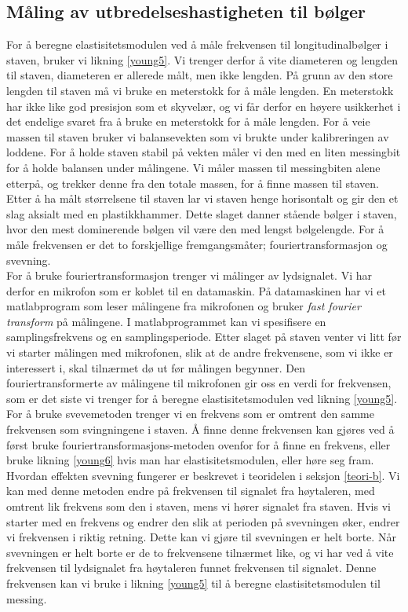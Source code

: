 \documentclass[%
 reprint,
 amsmath,amssymb,
 aps,
 norsk,
 booktabs
]{revtex4-1}
\begin{document}
\subsection{Måling av utbredelseshastigheten til bølger}
For å beregne elastisitetsmodulen ved å måle frekvensen til longitudinalbølger i staven, bruker vi likning \eqref{young5}. Vi trenger derfor å vite diameteren og lengden til staven, diameteren er allerede målt, men ikke lengden. På grunn av den store lengden til staven må vi bruke en meterstokk for å måle lengden. En meterstokk har ikke like god presisjon som et skyvelær, og vi får derfor en høyere usikkerhet i det endelige svaret fra å bruke en meterstokk for å måle lengden. For å veie massen til staven bruker vi balansevekten som vi brukte under kalibreringen av loddene. For å holde staven stabil på vekten måler vi den med en liten messingbit for å holde balansen under målingene. Vi måler massen til messingbiten alene etterpå, og trekker denne fra den totale massen, for å finne massen til staven. Etter å ha målt størrelsene til staven lar vi staven henge horisontalt og gir den et slag aksialt med en plastikkhammer. Dette slaget danner stående bølger i staven, hvor den mest dominerende bølgen vil være den med lengst bølgelengde. For å måle frekvensen er det to forskjellige fremgangsmåter; fouriertransformasjon og svevning.\\ For å bruke fouriertransformasjon trenger vi målinger av lydsignalet. Vi har derfor en mikrofon som er koblet til en datamaskin. På datamaskinen har vi et matlabprogram som leser målingene fra mikrofonen og bruker \textit{fast fourier transform} på målingene. I matlabprogrammet kan vi spesifisere en samplingsfrekvens og en samplingsperiode. Etter slaget på staven venter vi litt før vi starter målingen med mikrofonen, slik at de andre frekvensene, som vi ikke er interessert i, skal tilnærmet dø ut før målingen begynner. Den fouriertransformerte av målingene til mikrofonen gir oss en verdi for frekvensen, som er det siste vi trenger for å beregne elastisitetsmodulen ved likning \eqref{young5}.\\
For å bruke svevemetoden trenger vi en frekvens som er omtrent den samme frekvensen som svingningene i staven. Å finne denne frekvensen kan gjøres ved å først bruke fouriertransformasjons-metoden ovenfor for å finne en frekvens, eller bruke likning \eqref{young6} hvis man har elastisitetsmodulen, eller høre seg fram. Hvordan effekten svevning fungerer er beskrevet i teoridelen i seksjon \vref{teori-b}. Vi kan med denne metoden endre på frekvensen til signalet fra høytaleren, med omtrent lik frekvens som den i staven, mens vi hører signalet fra staven. Hvis vi starter med en frekvens og endrer den slik at perioden på svevningen øker, endrer vi frekvensen i riktig retning. Dette kan vi gjøre til svevningen er helt borte. Når svevningen er helt borte er de to frekvensene tilnærmet like, og vi har ved å vite frekvensen til lydsignalet fra høytaleren funnet frekvensen til signalet. Denne frekvensen kan vi bruke i likning \eqref{young5} til å beregne elastisitetsmodulen til messing.
\end{document}
